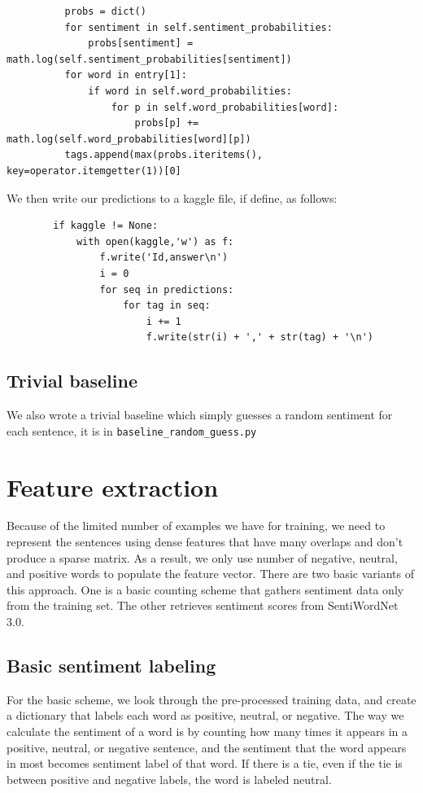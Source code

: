 \documentclass{article}
\begin{document}
\begin{verbatim}
          probs = dict()
          for sentiment in self.sentiment_probabilities:
              probs[sentiment] = math.log(self.sentiment_probabilities[sentiment])
          for word in entry[1]:
              if word in self.word_probabilities:
                  for p in self.word_probabilities[word]:
                      probs[p] += math.log(self.word_probabilities[word][p])
          tags.append(max(probs.iteritems(), key=operator.itemgetter(1))[0]
\end{verbatim}

We then write our predictions to a kaggle file, if define, as follows:
\begin{verbatim}
        if kaggle != None:
            with open(kaggle,'w') as f:
                f.write('Id,answer\n')
                i = 0
                for seq in predictions:
                    for tag in seq:
                        i += 1
                        f.write(str(i) + ',' + str(tag) + '\n')
\end{verbatim}

\subsection{Trivial baseline}
We also wrote a trivial baseline which simply guesses a random sentiment for each sentence, it is in \texttt{baseline\_random\_guess.py}


\section{Feature extraction}
Because of the limited number of examples we have for training, we need to represent the sentences using dense features that have many overlaps and don't produce a sparse matrix. As a result, we only use number of negative, neutral, and positive words to populate the feature vector. There are two basic variants of this approach. One is a basic counting scheme that gathers sentiment data only from the training set. The other retrieves sentiment scores from SentiWordNet 3.0.

\subsection{Basic sentiment labeling}
For the basic scheme, we look through the pre-processed training data, and create a dictionary that labels each word as positive, neutral, or negative. The way we calculate the sentiment of a word is by counting how many times it appears in a positive, neutral, or negative sentence, and the sentiment that the word appears in most becomes sentiment label of that word. If there is a tie, even if the tie is between positive and negative labels, the word is labeled neutral.
\end{document}
